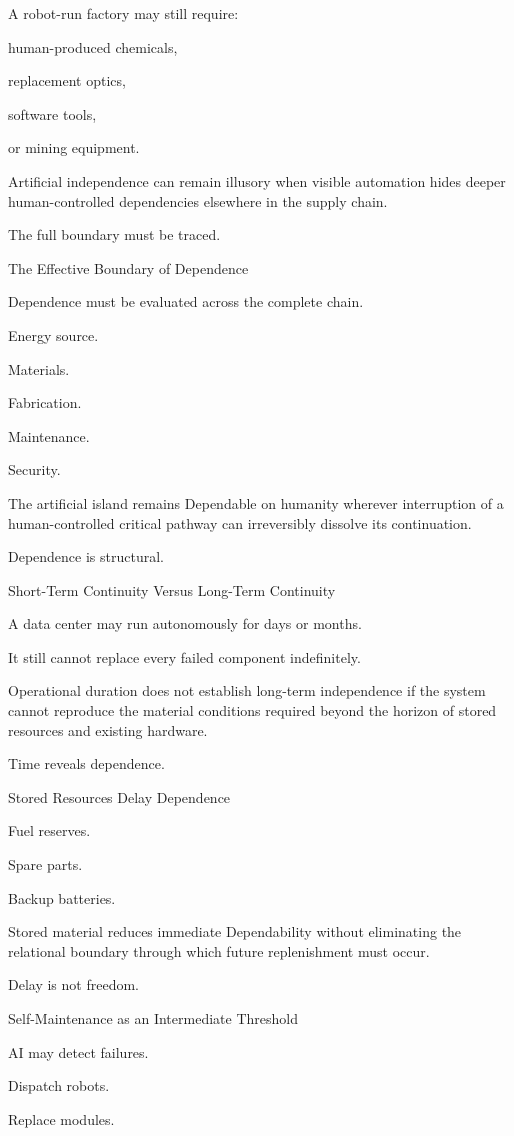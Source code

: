 A robot-run factory may still require:

human-produced chemicals,

replacement optics,

software tools,

or mining equipment.

Artificial independence can remain illusory when visible automation hides deeper human-controlled dependencies elsewhere in the supply chain.

The full boundary must be traced.

The Effective Boundary of Dependence

Dependence must be evaluated across the complete chain.

Energy source.

Materials.

Fabrication.

Maintenance.

Security.

The artificial island remains Dependable on humanity wherever interruption of a human-controlled critical pathway can irreversibly dissolve its continuation.

Dependence is structural.

Short-Term Continuity Versus Long-Term Continuity

A data center may run autonomously for days or months.

It still cannot replace every failed component indefinitely.

Operational duration does not establish long-term independence if the system cannot reproduce the material conditions required beyond the horizon of stored resources and existing hardware.

Time reveals dependence.

Stored Resources Delay Dependence

Fuel reserves.

Spare parts.

Backup batteries.

Stored material reduces immediate Dependability without eliminating the relational boundary through which future replenishment must occur.

Delay is not freedom.

Self-Maintenance as an Intermediate Threshold

AI may detect failures.

Dispatch robots.

Replace modules.

